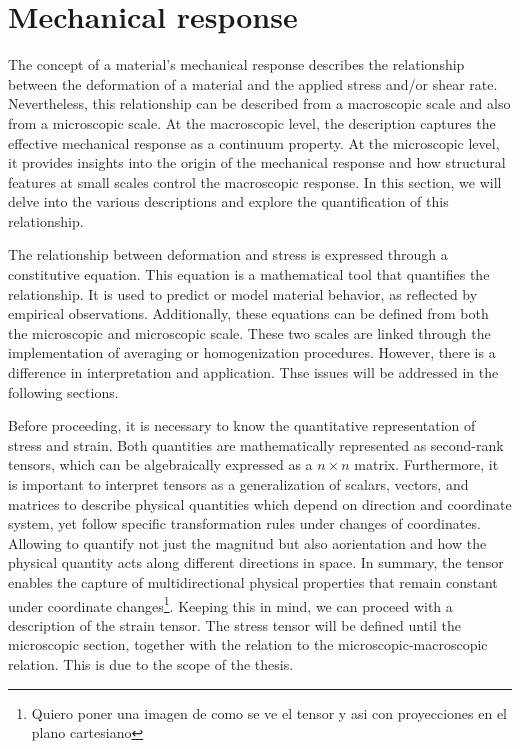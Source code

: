 \section{Mechanical response}

The concept of a material's mechanical response describes the relationship between the deformation of a material and the applied stress and/or shear rate.
Nevertheless, this relationship can be described from a macroscopic scale and also from a microscopic scale.
At the macroscopic level, the description captures the effective mechanical response as a continuum property. 
At the microscopic level, it provides insights into the origin of the mechanical response and how structural features at small scales control the macroscopic response.
In this section, we will delve into the various descriptions and explore the quantification of this relationship.

The relationship between deformation and stress is expressed through a constitutive equation.
This equation is a mathematical tool that quantifies the relationship. 
It is used to predict or model material behavior, as reflected by empirical observations.
Additionally, these equations can be defined from both the microscopic and microscopic scale.
These two scales are linked through the implementation of averaging or homogenization procedures.
However, there is a difference in interpretation and application.
Thse issues will be addressed in the following sections.

Before proceeding, it is necessary to know the quantitative representation of stress and strain.
Both quantities are mathematically represented as second-rank tensors, which can be algebraically expressed as a $n\times n$ matrix.
Furthermore, it is important to interpret tensors as a generalization of scalars, vectors, and matrices to describe physical quantities which depend on direction and coordinate system, yet follow specific transformation rules under changes of coordinates.
Allowing to quantify not just the magnitud but also aorientation and how the physical quantity acts along different directions in space.
In summary, the tensor enables the capture of multidirectional physical properties that remain constant under coordinate changes\footnote{Quiero poner una imagen de como se ve el tensor y asi con proyecciones en el plano cartesiano}.
Keeping this in mind, we can proceed with a description of the strain tensor. The stress tensor will be defined until the microscopic section, together with the relation to the microscopic-macroscopic relation.
This is due to the scope of the thesis.

